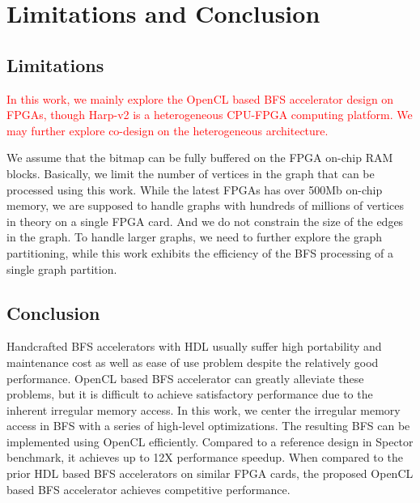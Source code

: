 \section{Limitations and Conclusion} \label{sec:conclusion}
\subsection{Limitations}
\textcolor{red}{In this work, we mainly explore the OpenCL based BFS accelerator 
design on FPGAs, though Harp-v2 is a heterogeneous CPU-FPGA computing platform. 
We may further explore co-design on the heterogeneous architecture.}

We assume that the bitmap can be fully buffered on the FPGA on-chip RAM blocks. 
Basically, we limit the number of vertices in the graph that 
can be processed using this work. While the latest FPGAs has over 
500Mb on-chip memory, we are supposed to handle graphs with hundreds 
of millions of vertices in theory on a single FPGA card. 
And we do not constrain the size of the edges in the graph. 
To handle larger graphs, we need to further explore 
the graph partitioning, while this work exhibits 
the efficiency of the BFS processing of a single graph partition.

\subsection{Conclusion}
Handcrafted BFS accelerators with HDL usually suffer high portability and maintenance cost 
as well as ease of use problem despite the relatively 
good performance. OpenCL based BFS accelerator can greatly alleviate these problems, but it is 
difficult to achieve satisfactory performance due to the inherent irregular memory access. 
In this work, we center the irregular memory access in BFS with  
a series of high-level optimizations. The resulting BFS can be implemented using OpenCL efficiently.
Compared to a reference design in Spector benchmark, it achieves up to 12X performance speedup.
When compared to the prior HDL based BFS accelerators on similar FPGA cards, 
the proposed OpenCL based BFS accelerator achieves competitive performance.


